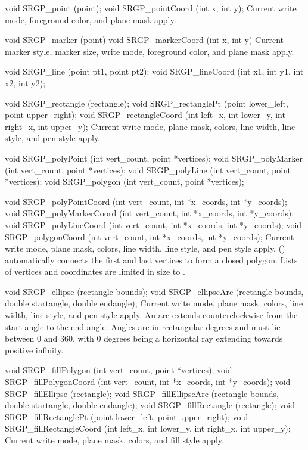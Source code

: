 \newsynopsis
void SRGP_point (point);
void SRGP_pointCoord (int x, int y);
\endsynopsis
Current write mode, foreground color, and plane mask apply.



\nextsynopsis
void SRGP_marker (point)
void SRGP_markerCoord (int x, int y)
\endsynopsis
Current marker style, marker size, write mode, 
foreground color, and plane mask apply.


\nextsynopsis
void SRGP_line (point pt1, point pt2);
void SRGP_lineCoord (int x1, int y1,  int x2, int y2);

void SRGP_rectangle (rectangle);
void SRGP_rectanglePt (point lower_left, point upper_right);
void SRGP_rectangleCoord (int left_x, int lower_y,  int right_x, int upper_y);
\endsynopsis
Current write mode, plane mask, colors, line width, line style, and pen style
apply.


\nextsynopsis
void SRGP_polyPoint (int vert_count, point *vertices);
void SRGP_polyMarker (int vert_count, point *vertices);
void SRGP_polyLine (int vert_count, point *vertices);
void SRGP_polygon (int vert_count, point *vertices);

void SRGP_polyPointCoord (int vert_count, int *x_coords, int *y_coords);
void SRGP_polyMarkerCoord (int vert_count, int *x_coords, int *y_coords);
void SRGP_polyLineCoord (int vert_count, int *x_coords, int *y_coords);
void SRGP_polygonCoord (int vert_count, int *x_coords, int *y_coords);
\endsynopsis
Current write mode, plane mask, colors, line width, line style, and pen style
apply.
()
automatically connects the first and last vertices
to form a closed polygon.  Lists of vertices and coordinates are limited
in size to .


\nextsynopsis
void SRGP_ellipse (rectangle bounds);
void SRGP_ellipseArc (rectangle bounds, double startangle, double endangle);
\endsynopsis
Current write mode, plane mask, colors, line width, line style, and pen style
apply.  An arc extends counterclockwise from the start angle to the end angle.
Angles are in rectangular degrees and must lie between 0 and 360, with 0
degrees being a horizontal ray extending towards positive infinity.

\nextsynopsis
void SRGP_fillPolygon (int vert_count, point *vertices);
void SRGP_fillPolygonCoord (int vert_count, int *x_coords, int *y_coords);
void SRGP_fillEllipse (rectangle);
void SRGP_fillEllipseArc (rectangle bounds, double startangle, double endangle);
void SRGP_fillRectangle (rectangle);
void SRGP_fillRectanglePt (point lower_left, point upper_right);
void SRGP_fillRectangleCoord (int left_x, int lower_y, int right_x, int upper_y);
\endsynopsis
Current write mode, plane mask, colors, and fill style apply.


